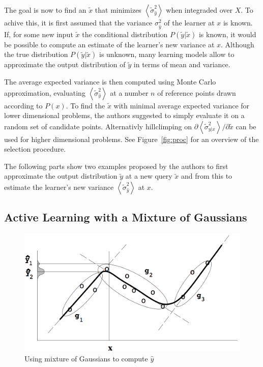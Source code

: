 \documentclass{article}
\newcommand{\xt}{\tilde{x}}
\newcommand{\yt}{\tilde{y}}
\newcommand{\st}{\tilde{\sigma}}
\newcommand{\E}[1]{\left< #1 \right>}
\newcommand{\so}{\sigma_{\hat{y}}^2}
\newcommand{\sn}{\left< \tilde{\sigma}_{\hat{y}}^2 \right>}
\begin{document}
The goal is now to find an $\xt$ that minimizes $\sn$ when integraded over $X$.
To achive this, it is first assumed that the variance $\so$ of
the learner at $x$ is known. If, for some new input $\xt$ the conditional
distribution $P(\yt|\xt)$ is known, it would be possible to compute an
estimate of the learner's new variance at $x$. Although the true distribution
$P(\yt|\xt)$ is unknown, many learning models allow to approximate the output
distribution of $\yt$ in terms of mean and variance.

The average expected variance is then computed using Monte Carlo approximation,
evaluating $\sn$ at a number $n$ of reference points drawn according to $P(x)$.
To find the $\xt$ with minimal average expected variance for lower dimensional problems,
the authors suggested to simply evaluate it on a random set of candidate points.
Alternativly hillclimping on ${\partial\E{\st_{y|x}^2}}/{\partial\xt}$
can be used for higher dimensional problems. See Figure~\ref{fig:proc} for an
overview of the selection procedure.

The following parts show two examples proposed by the authors to first
approximate the output distribution $\yt$ at a new query $\xt$ and
from this to estimate the learner's new variance $\sn$ at $x$.

\subsection{Active Learning with a Mixture of Gaussians}
\begin{figure}\centering
  \includegraphics[width=1.0\columnwidth,keepaspectratio]{../pics/GMM.png}
  \caption{Using mixture of Gaussians to compute $\hat{y}$}
  \label{fig:gmm}
\end{figure}
\end{document}
